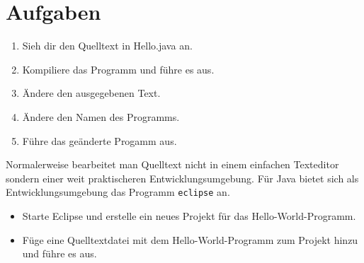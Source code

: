 \section {Aufgaben}
\begin{enumerate}
\item Sieh dir den Quelltext in Hello.java an.
\item Kompiliere das Programm und führe es aus.
\item Ändere den ausgegebenen Text.
\item Ändere den Namen des Programms.
\item Führe das geänderte Progamm aus.
\end{enumerate}

Normalerweise bearbeitet man Quelltext nicht in einem einfachen Texteditor sondern einer weit praktischeren Entwicklungsumgebung.
Für Java bietet sich als Entwicklungsumgebung das Programm \lstinline$eclipse$ an.
\begin{itemize}
\item Starte Eclipse und erstelle ein neues Projekt für das Hello-World-Programm.
\item Füge eine Quelltextdatei mit dem Hello-World-Programm zum Projekt hinzu und führe es aus.
\end{itemize}
